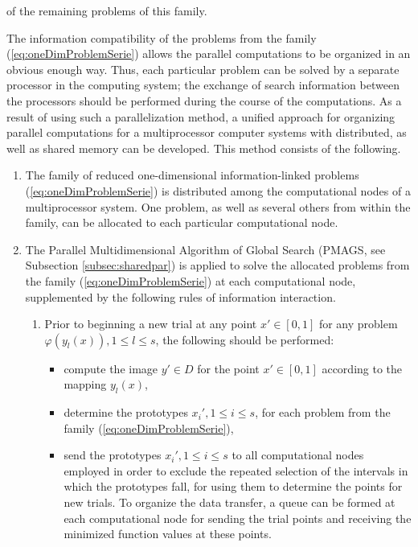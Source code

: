 \documentclass{gOMS2e}
\theoremstyle{plain}%
\theoremstyle{definition}
\theoremstyle{remark}
\begin{document}
of the remaining problems of this family.
\par
The information compatibility of the problems from the family (\ref{eq:oneDimProblemSerie}) allows the parallel
computations to be organized in an obvious enough way. Thus, each particular problem can
be solved by a separate processor in the computing system; the exchange of search information
between the processors should be performed during the course of the computations.
As a result of using such a parallelization method, a unified approach for organizing parallel
computations for a multiprocessor computer systems with distributed, as well as shared
memory can be developed. This method consists of the following.
\begin{enumerate}
  \item The family of reduced one-dimensional information-linked problems (\ref{eq:oneDimProblemSerie}) is
  distributed among the computational nodes of a multiprocessor system. One problem,
  as well as several others from within the family, can be allocated to each particular computational node.
  \item The Parallel Multidimensional Algorithm of Global Search (PMAGS, see Subsection \ref{subsec:sharedpar})
  is applied to solve the allocated problems from the family (\ref{eq:oneDimProblemSerie})
  at each computational node, supplemented by the following rules of information interaction.
  \begin{enumerate}
    \item Prior to beginning a new trial at any point \(x'\in [0,1]\) for any problem \(\varphi(y_l(x)),1\leqslant l\leqslant s\),
    the following should be performed:
    \begin{itemize}
      \item compute the image \(y'\in D\) for the point \(x'\in [0, 1]\) according to the mapping \(y_l(x)\),
      \item determine  the prototypes \(x_i',1\leqslant i\leqslant s\), for each
      problem from the family (\ref{eq:oneDimProblemSerie}),
      \item send the prototypes \(x_i',1\leqslant i\leqslant s\) to all computational
      nodes employed in order to exclude the repeated selection of the intervals in
      which the prototypes fall, for using them to determine the points for new trials.
      To organize the data transfer, a queue can be formed at each computational
      node for sending the trial points and receiving the minimized function values at these points.
    \end{itemize}

\end{enumerate}
\end{enumerate}
\end{document}
